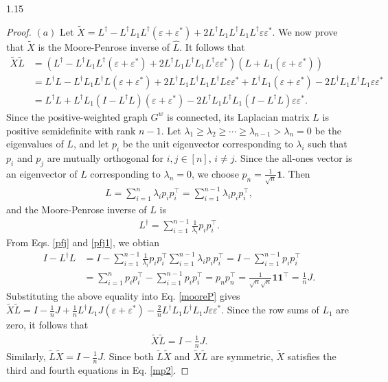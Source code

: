 \documentclass[preprint,12pt]{elsarticle1}
\numberwithin{equation}{section}
\begin{document}
\begin{spacing}{1.15}
\begin{proof}
$(a)$ Let $\widetilde{X}=L^{\dag}-
L^{\dag}L_{1}L^{\dag}(\varepsilon+\varepsilon^{*})
+2L^{\dag}L_{1}L^{\dag}L_{1}L^{\dag}
\varepsilon\varepsilon^{*}.$  We now prove that $\widetilde{X}$ is the Moore-Penrose inverse of $\widehat{L}$.
It follows that \begin{align}\nonumber
\widetilde{X}\widetilde{L}&
=(L^{\dag}-
L^{\dag}L_{1}L^{\dag}(\varepsilon+\varepsilon^{*})
+2L^{\dag}L_{1}L^{\dag}L_{1}L^{\dag}
\varepsilon\varepsilon^{*})
(L+L_{1}(\varepsilon+\varepsilon^{*}))
\\ \nonumber
&=L^{\dag}L-
L^{\dag}L_{1}L^{\dag}L(\varepsilon+\varepsilon^{*})+
2L^{\dag}L_{1}L^{\dag}L_{1}L^{\dag}L
\varepsilon\varepsilon^{*}+L^{\dag}L_{1}(\varepsilon+\varepsilon^{*})-
2L^{\dag}L_{1}L^{\dag}L_{1}\varepsilon\varepsilon^{*}\\ \label{mooreP}
&=L^{\dag}L+L^{\dag}L_{1}(I-L^{\dag}L)(\varepsilon+\varepsilon^{*})
-2L^{\dag}L_{1}L^{\dag}L_{1}(I-L^{\dag}L)\varepsilon\varepsilon^{*}.
\end{align}
 Since the  positive-weighted graph
$G^{w}$ is connected, its Laplacian matrix $L$ is positive semidefinite with rank $n-1$\cite[p.~50]{bapat2010graphs}.
 Let $\lambda_{1}\geq\lambda_{2}
 \geq\cdots\geq\lambda_{n-1}>\lambda_{n}=0$  be the eigenvalues of $L$, and let $p_{i}$ be the unit eigenvector corresponding to $\lambda_{i}$ such that $p_{i}$ and $p_{j}$ are mutually orthogonal for $i,j\in[n]$, $i\neq j$.
 Since the all-ones vector is an eigenvector of $L$ corresponding to $\lambda_{n}=0$,  we choose $p_{n}=\frac{1}{\sqrt{n}}\mathbf{1}$. Then \begin{align}\label{pfj}
  L=\sum_{i=1}^{n}\lambda_{i}p_{i}p_{i}^{\top}
  =\sum_{i=1}^{n-1}\lambda_{i}p_{i}p_{i}^{\top},\end{align}
  and the Moore-Penrose inverse of $L$ is \begin{align}\label{pfj1}L^{\dag}=
\sum_{i=1}^{n-1}\frac{1}{\lambda_{i}}p_{i}p_{i}^{\top}.\end{align}
From Eqs. \eqref{pfj} and \eqref{pfj1}, we obtian
   \begin{align}\nonumber I-L^{\dag}L&=I-\sum_{i=1}^{n-1}\frac{1}{\lambda_{i}}p_{i}p_{i}^{\top}
   \sum_{i=1}^{n-1}
   \lambda_{i}p_{i}p_{i}^{\top}=
I-\sum_{i=1}^{n-1}p_{i}p_{i}^{\top}\\ \nonumber
&=\sum_{i=1}^{n}p_{i}p_{i}^{\top}-
\sum_{i=1}^{n-1}p_{i}p_{i}^{\top}=p_{n}p_{n}^{\top}=
\frac{1}{\sqrt{n}\sqrt{n}}\textbf{1}\textbf{1}^{\top}=\frac{1}{n}
J.\end{align}
Substituting the above equality  into Eq. \eqref{mooreP} gives $
\widetilde{X}\widetilde{L}=I-\frac{1}{n}
J+\frac{1}{n}L^{\dag}L_{1}J(\varepsilon+\varepsilon^{*})
-\frac{2}{n}L^{\dag}L_{1}
L^{\dag}L_{1}J\varepsilon\varepsilon^{*}.$ Since  the row sums of $L_{1}$ are zero,  it follows that\begin{align}\label{npd}
\widetilde{X}\widetilde{L}=I-\frac{1}{n}J.
\end{align}
Similarly, $\widetilde{L}\widetilde{X}=I-\frac{1}{n}J.$
Since both $\widetilde{L}\widetilde{X}$ and $\widetilde{X}
\widetilde{L}$
  are symmetric,  $\widetilde{X}$ satisfies the third and fourth equations in Eq. \eqref{mp2}.


\end{proof}
\end{spacing}
\end{document}
